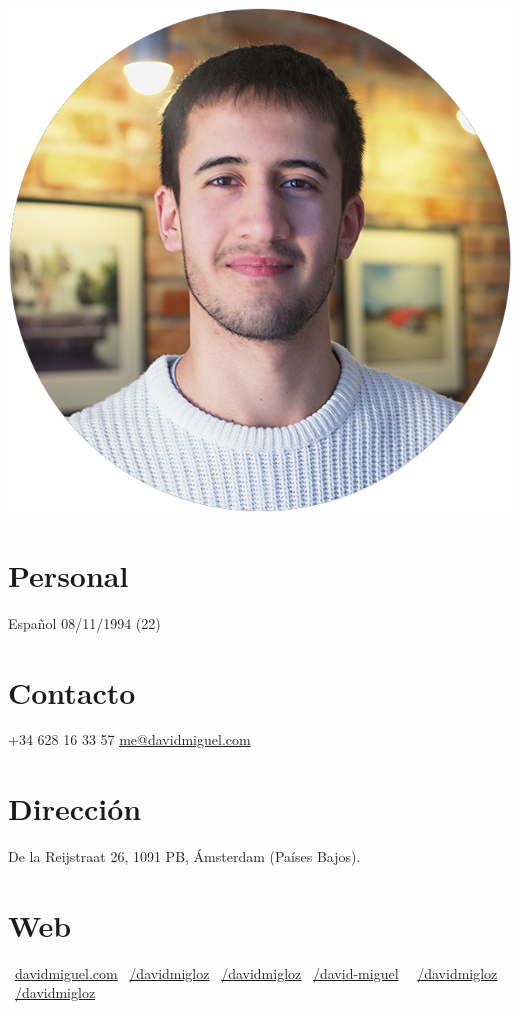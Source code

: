 \documentclass[]{friggeri-cv}
\begin{document}
      

\begin{aside}
  \includegraphics[scale=0.18]{img/profile.png}
  \section{Personal}
    Español
    08/11/1994 (22)
    ~  
  \section{Contacto}
    +34 628 16 33 57
    \href{mailto:me@davidmiguel.com}{me@davidmiguel.com}
    ~  
  \section{Dirección} 
    De la Reijstraat 26,
    1091 PB, Ámsterdam
    (Países Bajos).
    ~    
  \section{Web}
    \faGlobe\ \href{http://davidmiguel.com}{davidmiguel.com}
    \faLinkedin\ \href{https://www.linkedin.com/in/davidmigloz}{/davidmigloz}
    \faGithub\ \href{https://github.com/davidmigloz/}{/davidmigloz}
    \faStackOverflow\ \href{http://stackoverflow.com/users/6305235/david-miguel}{/david-miguel}    
    \faFacebook\ \ \href{https://www.facebook.com/DavidMigLoz}{/davidmigloz}
    \faTwitter\ \href{https://twitter.com/DavidMigLoz}{/davidmigloz}
    ~

\end{aside}
\end{document}
